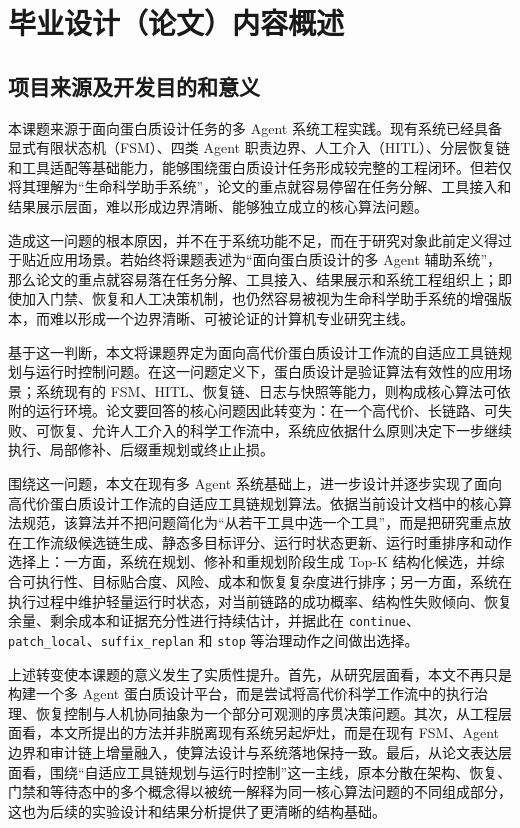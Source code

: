 \section{毕业设计（论文）内容概述}

\subsection{项目来源及开发目的和意义}

本课题来源于面向蛋白质设计任务的多 Agent 系统工程实践。现有系统已经具备显式有限状态机（FSM）、四类 Agent 职责边界、人工介入（HITL）、分层恢复链和工具适配等基础能力，能够围绕蛋白质设计任务形成较完整的工程闭环。但若仅将其理解为“生命科学助手系统”，论文的重点就容易停留在任务分解、工具接入和结果展示层面，难以形成边界清晰、能够独立成立的核心算法问题。

造成这一问题的根本原因，并不在于系统功能不足，而在于研究对象此前定义得过于贴近应用场景。若始终将课题表述为“面向蛋白质设计的多 Agent 辅助系统”，那么论文的重点就容易落在任务分解、工具接入、结果展示和系统工程组织上；即使加入门禁、恢复和人工决策机制，也仍然容易被视为生命科学助手系统的增强版本，而难以形成一个边界清晰、可被论证的计算机专业研究主线。

基于这一判断，本文将课题界定为面向高代价蛋白质设计工作流的自适应工具链规划与运行时控制问题。在这一问题定义下，蛋白质设计是验证算法有效性的应用场景；系统现有的 FSM、HITL、恢复链、日志与快照等能力，则构成核心算法可依附的运行环境。论文要回答的核心问题因此转变为：在一个高代价、长链路、可失败、可恢复、允许人工介入的科学工作流中，系统应依据什么原则决定下一步继续执行、局部修补、后缀重规划或终止止损。

围绕这一问题，本文在现有多 Agent 系统基础上，进一步设计并逐步实现了面向高代价蛋白质设计工作流的自适应工具链规划算法。依据当前设计文档中的核心算法规范，该算法并不把问题简化为“从若干工具中选一个工具”，而是把研究重点放在工作流级候选链生成、静态多目标评分、运行时状态更新、运行时重排序和动作选择上：一方面，系统在规划、修补和重规划阶段生成 Top-K 结构化候选，并综合可执行性、目标贴合度、风险、成本和恢复复杂度进行排序；另一方面，系统在执行过程中维护轻量运行时状态，对当前链路的成功概率、结构性失败倾向、恢复余量、剩余成本和证据充分性进行持续估计，并据此在 \texttt{continue}、\texttt{patch\_local}、\texttt{suffix\_replan} 和 \texttt{stop} 等治理动作之间做出选择。

上述转变使本课题的意义发生了实质性提升。首先，从研究层面看，本文不再只是构建一个多 Agent 蛋白质设计平台，而是尝试将高代价科学工作流中的执行治理、恢复控制与人机协同抽象为一个部分可观测的序贯决策问题。其次，从工程层面看，本文所提出的方法并非脱离现有系统另起炉灶，而是在现有 FSM、Agent 边界和审计链上增量融入，使算法设计与系统落地保持一致。最后，从论文表达层面看，围绕“自适应工具链规划与运行时控制”这一主线，原本分散在架构、恢复、门禁和等待态中的多个概念得以被统一解释为同一核心算法问题的不同组成部分，这也为后续的实验设计和结果分析提供了更清晰的结构基础。

